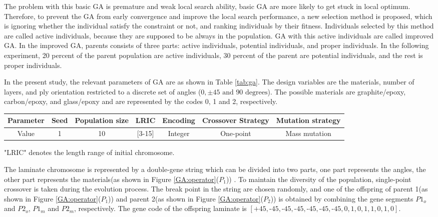 \documentclass[USenglish]{article}
\begin{document}
  The problem with this basic GA is premature and weak local search ability, basic GA are more likely
to get stuck in local optimum. Therefore, to prevent the GA from early convergence and improve the
local search performance, a new selection method is proposed, which is ignoring whether the
individual satisfy the constraint or not, and ranking individuals by their fitness. Individuals
selected by this method are called active individuals, because they are supposed to be always in the
population. GA with this active individuals are called improved GA. In the improved GA, parents
consists of three parts: active individuals, potential individuals, and proper individuals. In the
following experiment, 20 percent of the parent population are active individuals, 30 percent of the
parent are potential individuals, and the rest is proper individuals.

  In the present study, the relevant parameters of GA are as shown in Table \ref{tab:ga}. The design
variables are the materials, number of layers, and ply orientation restricted to a discrete set of
angles ($0,\pm 45 \text{ and } 90 \text{ degrees} $). The possible materials are graphite/epoxy,
carbon/epoxy, and glass/epoxy and are represented by the codes 0, 1 and 2, respectively.


\begin{adjustbox}{width={\textwidth},totalheight={\textheight},keepaspectratio}
\begin{tabular}{ccccccc}
	\toprule
	Parameter &  Seed &Population size & LRIC  & Encoding &  Crossover Strategy& Mutation strategy\\
	\midrule
	Value     & 1     &10               & [3-15]& Integer  &  One-point &Mass mutation   \\
	\bottomrule
\end{tabular}
\end{adjustbox}
\label{tab:ga}
\begin{tablenotes}\footnotesize
\item{"LRIC" denotes the length range of initial chromosome.}
\end{tablenotes}

    
  The laminate chromosome is  represented by a double-gene string which can be divided into two parts,
one part represents the angles, the other part represents the materials(as shown in Figure
\ref{GA:operator}($P_1$)) . To maintain the diversity of the population, single-point crossover is
taken during the evolution process. The break point in the string are chosen randomly, and one of
the offspring of parent 1(as shown in Figure \ref{GA:operator}($P_1$))  and parent 2(as shown in
Figure \ref{GA:operator}($P_2$)) is obtained by combining the gene segments $P1_o$ and $P2_o$,
$P1_m$ and $P2_m$, respectively. The gene code of the offspring laminate is
$[\text{+}45,\text{-}45,\text{-}45,\text{-}45,\text{-}45,\text{-}45,\text{-}45,0,1,0,1,1,0,1,0]$.
\end{document}
